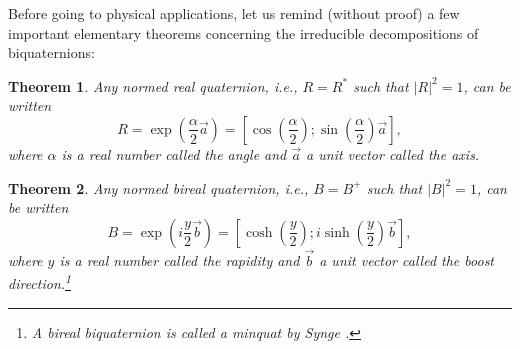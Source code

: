 \documentclass [12pt,a4paper      ]{article}
\newtheorem{theorem}{Theorem}
\begin{document}
     Before  going to physical applications,  let  us  remind 
(without   proof) a few important  elementary  theorems   concerning   the 
irreducible decompositions of biquaternions:

%
\begin{theorem}
\label{theo:1}
%
      Any normed real quaternion, i.e.,  $R=R^*$ such that $|R|^2 =1$,
      can be written 
%
      \begin{equation}\label{E10}
        R = \exp(\frac{\alpha}{2}\vec{a})  =
        [\cos(\frac{\alpha}{2}); \sin(\frac{\alpha}{2})\vec{a}],   %
      \end{equation}
%
      where $\alpha$ is  a real number called the angle and $\vec{a}$ a  unit 
      vector called the axis.
%
\end{theorem}
%
%
\begin{theorem}
\label{theo:2}
%
     Any normed bireal quaternion, i.e., $B=B^+$ such that $|B|^2 =1$,
     can be written 
%
     \begin{equation}\label{E11}
           B = \exp(i\frac{y}{2}\vec{b}) =
               [\cosh(\frac{y}{2}); i\sinh(\frac{y}{2})\vec{b}],   %
     \end{equation}
%
     where $y$ is a real number called the rapidity and $\vec{b}$ a  unit 
     vector called the boost direction.\footnote{A bireal biquaternion is 
     called a \emph{minquat} by Synge \cite{R8}.}
%
\end{theorem}
%
\end{document}
